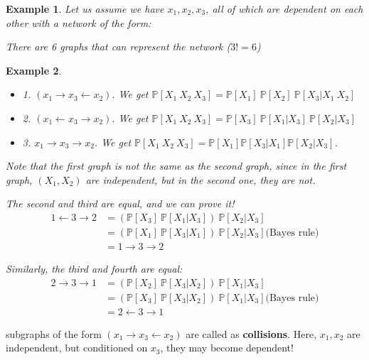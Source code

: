 \documentclass[11pt]{book}
\renewcommand{\P}[1]{\ensuremath{\mathbb{P} \left[ #1 \right]}}
\newtheorem{example}{Example}
\begin{document}
\begin{example}
    Let us assume we have $x_1, x_2, x_3$, all of which are 
    dependent on each other with a network of the form:

\begin{tikzpicture}
\end{tikzpicture}

There are 6 graphs that can represent the network ($3!=6$)
\end{example}

\begin{example}
\begin{itemize}
    \item 1. ${(x_1 \rightarrow x_3 \leftarrow x_2)}$. We get $\P{X_1~X_2~X_3} = \P{X_1}~\P{X_2}~\P{X_3|X_1~X_2}$
    \item 2.  ${(x_1 \leftarrow x_3 \rightarrow x_2)}$. We get $\P{X_1~X_2~X_3} = \P{X_3}~\P{X_1|X_3}~\P{X_2|X_3}$
    \item 3. ${x_1 \rightarrow x_3 \rightarrow x_2}$. We get $\P{X_1~X_2~X_3} = \P{X_1} \P{X_3 | X_1} \P{X_2|X_3}$.
\end{itemize}

Note that the first graph is not the same as the second graph, 
since in the first graph, $(X_1, X_2)$ are independent, but in the second
one, they are not.

The second and third are equal, and we can prove it!
\begin{align*}
    1 \leftarrow 3 \rightarrow 2 &= (\P{X_3}~\P{X_1|X_3})~\P{X_2|X_3}  \\
       &=   (\P{X_1}~\P{X_3|X_1})~\P{X_2|X_3} \text{(Bayes rule)} \\
       &= 1 \rightarrow 3 \rightarrow 2
\end{align*}

Similarly, the third and fourth are equal:
\begin{align*}
    2 \rightarrow 3 \rightarrow 1 &= (\P{X_2}~\P{X_3|X_2})~\P{X_1|X_3}  \\
       &=   (\P{X_3}~\P{X_3|X_2})~\P{X_1|X_3} \text{(Bayes rule)} \\
       &= 2 \leftarrow 3 \rightarrow 1
\end{align*}
\end{example}

subgraphs of the form ${(x_1 \rightarrow x_3 \leftarrow x_2)}$ are called as
\textbf{collisions}. Here, $x_1, x_2$ are independent, but conditioned on $x_3$,
they may become dependent!
\end{document}
